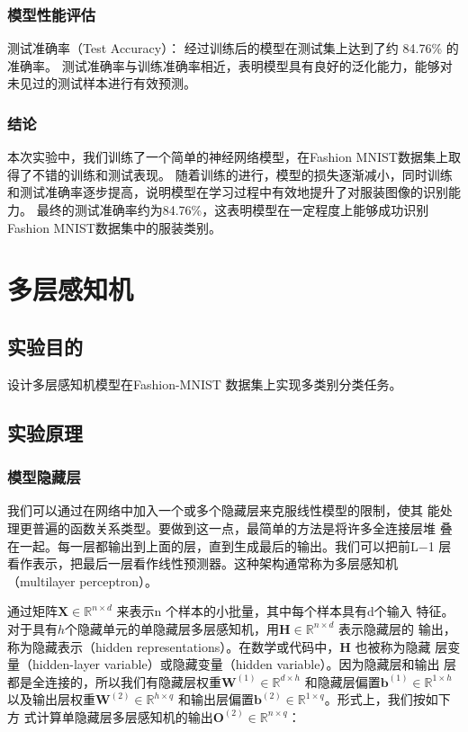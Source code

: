 \documentclass[a4paper,12pt]{article}
\begin{document}
\subsubsection{模型性能评估}
测试准确率（Test Accuracy）：
经过训练后的模型在测试集上达到了约 84.76\% 的准确率。
测试准确率与训练准确率相近，表明模型具有良好的泛化能力，能够对未见过的测试样本进行有效预测。

\subsubsection{结论}
本次实验中，我们训练了一个简单的神经网络模型，在Fashion MNIST数据集上取得了不错的训练和测试表现。
随着训练的进行，模型的损失逐渐减小，同时训练和测试准确率逐步提高，说明模型在学习过程中有效地提升了对服装图像的识别能力。
最终的测试准确率约为84.76\%，这表明模型在一定程度上能够成功识别Fashion MNIST数据集中的服装类别。
\newpage
\section{多层感知机}
\subsection{实验目的}
设计多层感知机模型在Fashion-MNIST 数据集上实现多类别分类任务。
\subsection{实验原理}
\subsubsection{模型隐藏层}
我们可以通过在网络中加入一个或多个隐藏层来克服线性模型的限制，使其
能处理更普遍的函数关系类型。要做到这一点，最简单的方法是将许多全连接层堆
叠在一起。每一层都输出到上面的层，直到生成最后的输出。我们可以把前L−1 层
看作表示，把最后一层看作线性预测器。这种架构通常称为多层感知机（multilayer
perceptron）。

通过矩阵$\mathbf{X} \in \mathbb{R}^{n \times d}$ 来表示n 个样本的小批量，其中每个样本具有d个输入
特征。对于具有$h$个隐藏单元的单隐藏层多层感知机，用$\mathbf{H} \in \mathbb{R}^{n \times d}$ 表示隐藏层的
输出，称为隐藏表示（hidden representations）。在数学或代码中，$\mathbf{H}$ 也被称为隐藏
层变量（hidden-layer variable）或隐藏变量（hidden variable）。因为隐藏层和输出
层都是全连接的，所以我们有隐藏层权重$\mathbf{W}^{(1)} \in \mathbb{R}^{d \times h}$ 和隐藏层偏置$\mathbf{b}^{(1)} \in \mathbb{R}^{1 \times h}$
以及输出层权重$\mathbf{W}^{(2)} \in \mathbb{R}^{h \times q}$ 和输出层偏置$\mathbf{b}^{(2)} \in \mathbb{R}^{1 \times q}$。形式上，我们按如下方
式计算单隐藏层多层感知机的输出$\mathbf{O}^{(2)} \in \mathbb{R}^{n \times q}$：
\end{document}
